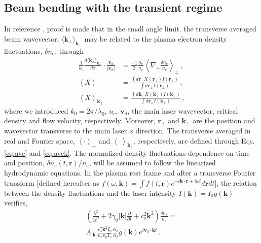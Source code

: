 \documentclass[%
 reprint,
 amsmath,amssymb,
 aps,
]{revtex4-1}
\begin{document}
\subsection{Beam bending with the transient regime}
In reference \cite{POP_Rose_96}, proof is made that in the small angle limit,  the transverse averaged beam wavevector, $ \langle \mathbf{k}_\perp\rangle_{\mathbf{k}_\perp}$ may be related to the plasma electron density fluctuations, $\delta n_e$, through 
  \begin{align}
\frac{1}{k_0} \frac{d \langle \mathbf{k}_\perp \rangle_{\mathbf{k}_\perp}    }{d x} \cdot \frac{ \mathbf{v}_d }{ \vert \mathbf{v}_d \vert } &
=\frac{-1}{2}\frac{n_e}{n_c}
\left\langle\nabla_\perp\frac{\delta n_e}{n_e }\right\rangle_\perp \label{eq:bbrate0} \, ,\\
\left\langle X \right\rangle_\perp &= \frac{ \int d\mathbf{r}_\perp X(\mathbf{r}_\perp)   I(\mathbf{r}_\perp) }{ \int d\mathbf{r}_\perp   I(\mathbf{r}_\perp)} \label{eq:ave}\, , \\
%
\left\langle X \right\rangle_{\mathbf{k}_\perp} &= \frac{ \int d\mathbf{k}_\perp X(\mathbf{k}_\perp)   I(\mathbf{k}_\perp) }{ \int d\mathbf{r}_\perp   I(\mathbf{k}_\perp)} \label{eq:avek}\, ,
\end{align}
 where we introduced $k_0=2\pi/\lambda_0$, $n_c$, $\mathbf{v}_d$,  the main laser wavevector, critical density and flow velocity, respectively.  Moreover, $\mathbf{r}_\perp$ and $\mathbf{k}_\perp$ are the position and wavevector transverse to the main laser $x$ direction. The transverse averaged in real and Fourier space, $\left\langle \cdot \right\rangle_\perp$ and $\left\langle \cdot \right\rangle_{\mathbf{k}_\perp}$, respectively, are defined through Eqs. \eqref{eq:ave} and \eqref{eq:avek}. 
The normalized density fluctuations dependence on time and position, $\delta n_e(t,\mathbf{r})/n_e$, will be assumed to follow  the  linearized hydrodynamic equations. In the plasma rest frame and after a transverse Fourier transform [defined hereafter as $ f(\omega,\mathbf{k})=\int f(t,\mathbf{r})e^{-i\mathbf{k}\cdot\mathbf{r}+i\omega t} d\mathbf{r}dt$], the relation between the density fluctuations and the laser intensity $I(\mathbf{k})=I_0g(\mathbf{k})$ verifies, 
\begin{align}
    \left(\frac{\partial^2}{\partial t^2} + 2\gamma_0 \vert \mathbf{k}\vert \frac{\partial}{\partial t} +c_s^2 \mathbf{k}^2\right)\frac{\delta n_e}{n_e } = \nonumber\\ 
   A_{\vert \mathbf{k}\vert}   \frac{c_s^2 \mathbf{k}^2I_0}{n_cv_gT_e} \frac{\alpha_k}{\alpha_f}g(\mathbf{k}) e^{i\mathbf{v}_d \cdot \mathbf{k}t}\, . \label{eq:4}
\end{align}
\end{document}
